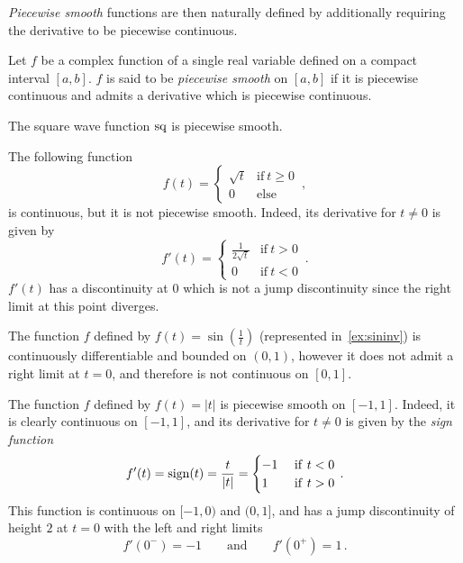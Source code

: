 \emph{Piecewise smooth} functions are then naturally defined by additionally requiring the
derivative to be piecewise continuous.
\begin{definition}
  \label{def:pw-smooth}
  Let $f$ be a complex function of a single real variable defined on a compact interval $[a,b]$.
  $f$ is said to be \emph{piecewise smooth} on $[a,b]$ if it is piecewise continuous and
  admits a derivative which is piecewise continuous.
\end{definition}
\begin{example}
  The square wave function $\operatorname{sq}$ is piecewise smooth.
\end{example}
\begin{example}
  The following function
  \begin{equation}
    f(t)=
    \begin{cases}
      \sqrt{t} & \text{if}~t\geq 0\\
      0 & \text{else}
    \end{cases}\,,
  \end{equation}
  is continuous, but it is not piecewise smooth. Indeed, its derivative for $t\neq 0$ is
  given by
  \begin{equation}
    f'(t)=
    \begin{cases}
      \frac{1}{2\sqrt{t}} & \text{if}~t>0\\
      0 & \text{if}~t<0
    \end{cases}\,.
  \end{equation}
  $f'(t)$ has a discontinuity at $0$ which is not a jump discontinuity since the right
  limit at this point diverges.
\end{example}
\begin{example}
  \label{ex:sininv}
  The function $f$ defined by $f(t)=\sin(\frac{1}{t})$ (represented in~\cref{ex:sininv})
  is continuously differentiable and bounded on $(0,1)$, however it does not admit a right
  limit at $t=0$, and therefore is not continuous on $[0,1]$.
\end{example}
\begin{example}
  The function $f$ defined by $f(t)=|t|$ is piecewise smooth on $[-1,1]$. Indeed, it is
  clearly continuous on $[-1,1]$, and its derivative for $t\neq 0$ is given by the
  \emph{sign function}
  \begin{equation}
    f'(t)=\operatorname{sign}(t)=\frac{t}{|t|}=
    \begin{cases}
      -1&~\mathrm{if}~t<0\\
      1&~\mathrm{if}~t>0
    \end{cases}\,.
  \end{equation}
  This function is continuous on $[-1,0)$ and $(0,1]$, and has a jump discontinuity of
  height $2$ at $t=0$ with the left and right limits
  \begin{equation}
    f'(0^-)=-1\qquad\text{and}\qquad f'(0^+)=1\,.
  \end{equation}
\end{example}
